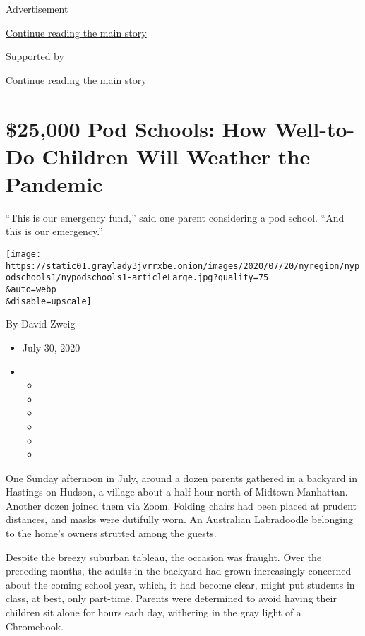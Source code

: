 Advertisement

\protect\hyperlink{after-top}{Continue reading the main story}

Supported by

\protect\hyperlink{after-sponsor}{Continue reading the main story}

\hypertarget{25000-pod-schools-how-well-to-do-children-will-weather-the-pandemic}{%
\section{\$25,000 Pod Schools: How Well-to-Do Children Will Weather the
Pandemic}\label{25000-pod-schools-how-well-to-do-children-will-weather-the-pandemic}}

``This is our emergency fund,'' said one parent considering a pod
school. ``And this is our emergency.''

\texttt{[image: https://static01.graylady3jvrrxbe.onion/images/2020/07/20/nyregion/nypodschools1/nypodschools1-articleLarge.jpg?quality=75\\\&auto=webp\\\&disable=upscale]}

By David Zweig

\begin{itemize}
\item
  July 30, 2020
\item
  \begin{itemize}
  \item
  \item
  \item
  \item
  \item
  \item
  \end{itemize}
\end{itemize}

One Sunday afternoon in July, around a dozen parents gathered in a
backyard in Hastings-on-Hudson, a village about a half-hour north of
Midtown Manhattan. Another dozen joined them via Zoom. Folding chairs
had been placed at prudent distances, and masks were dutifully worn. An
Australian Labradoodle belonging to the home's owners strutted among the
guests.

Despite the breezy suburban tableau, the occasion was fraught. Over the
preceding months, the adults in the backyard had grown increasingly
concerned about the coming school year, which, it had become clear,
might put students in class, at best, only part-time. Parents were
determined to avoid having their children sit alone for hours each day,
withering in the gray light of a Chromebook.


